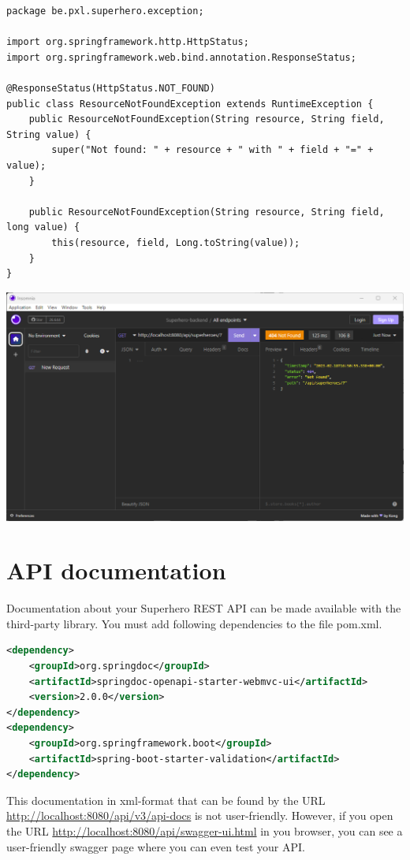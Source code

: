 \begin{lstlisting}
package be.pxl.superhero.exception;

import org.springframework.http.HttpStatus;
import org.springframework.web.bind.annotation.ResponseStatus;

@ResponseStatus(HttpStatus.NOT_FOUND)
public class ResourceNotFoundException extends RuntimeException {
    public ResourceNotFoundException(String resource, String field, String value) {
        super("Not found: " + resource + " with " + field + "=" + value);
    }

    public ResourceNotFoundException(String resource, String field, long value) {
        this(resource, field, Long.toString(value));
    }
}
\end{lstlisting}

\includegraphics[width=\textwidth]{./images/chapter2/not_found_2.png}

\section{API documentation}

Documentation about your Superhero REST API can be made available with the third-party library. You must add following dependencies to the file pom.xml.

\begin{lstlisting}[language=xml]
<dependency>
	<groupId>org.springdoc</groupId>
	<artifactId>springdoc-openapi-starter-webmvc-ui</artifactId>
	<version>2.0.0</version>
</dependency>
<dependency>
	<groupId>org.springframework.boot</groupId>
	<artifactId>spring-boot-starter-validation</artifactId>
</dependency>
\end{lstlisting}

This documentation in xml-format that can be found by the URL \url{http://localhost:8080/api/v3/api-docs} is not user-friendly.  However, if you open the URL \url{http://localhost:8080/api/swagger-ui.html} in you browser, you can see a user-friendly swagger page where you can even test your API.


